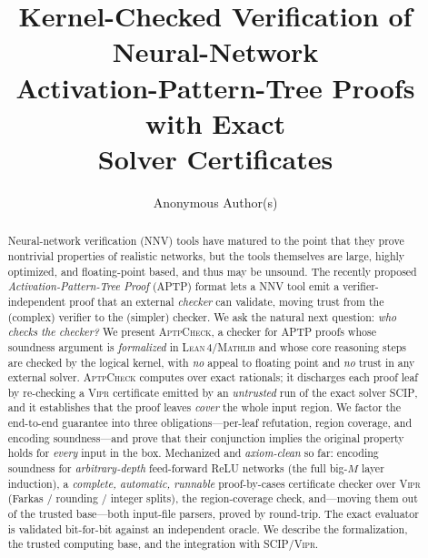 \documentclass[runningheads]{llncs}
\newcommand{\vipr}{\textsc{Vipr}}
\newcommand{\scip}{\textsc{SCIP}}
\newcommand{\tool}{\textsc{AptpCheck}}
\newcommand{\lean}{\textsc{Lean\,4}}
\newcommand{\mathlib}{\textsc{Mathlib}}
\begin{document}
\title{Kernel-Checked Verification of Neural-Network\\ Activation-Pattern-Tree Proofs with Exact\\ Solver Certificates}

\author{Anonymous Author(s)}                 %

\maketitle

\begin{abstract}
Neural-network verification (NNV) tools have matured to the point that they
prove nontrivial properties of realistic networks, but the tools themselves are
large, highly optimized, and floating-point based, and thus may be unsound. The
recently proposed \emph{Activation-Pattern-Tree Proof} (APTP) format lets a NNV
tool emit a verifier-independent proof that an external \emph{checker} can
validate, moving trust from the (complex) verifier to the (simpler) checker.
We ask the natural next question: \emph{who checks the checker?} We present
\tool, a checker for APTP proofs whose soundness argument is \emph{formalized} in
\lean{}/\mathlib{} and whose core reasoning steps are checked by the logical kernel,
with \emph{no} appeal to floating point and \emph{no} trust in any external solver.
\tool{} computes over exact rationals; it discharges each proof leaf by re-checking a
\vipr{} certificate emitted by an \emph{untrusted} run of the exact solver \scip{},
and it establishes that the proof leaves \emph{cover} the whole input region. We
factor the end-to-end guarantee into three obligations---per-leaf refutation, region
coverage, and encoding soundness---and prove that their conjunction implies the
original property holds for \emph{every} input in the box. Mechanized and
\emph{axiom-clean} so far: encoding soundness for \emph{arbitrary-depth} feed-forward
ReLU networks (the full big-$M$ layer induction), a \emph{complete, automatic,
runnable} proof-by-cases certificate checker over \vipr{} (Farkas / rounding / integer
splits), the region-coverage check, and---moving them out of the trusted base---both
input-file parsers, proved by round-trip. The exact evaluator is validated bit-for-bit
against an independent oracle. We describe the formalization, the trusted computing
base, and the integration with \scip/\vipr.
\end{abstract}
\end{document}
